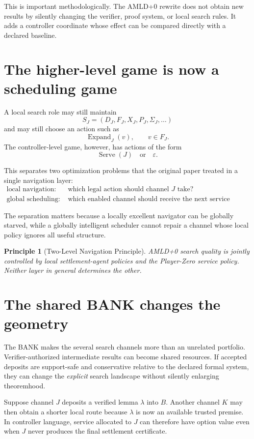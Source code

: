 \documentclass[11pt]{article}
\newtheorem{principle}[definition]{Principle}
\begin{document}
This is important methodologically.  The AMLD+0 rewrite does not obtain new
results by silently changing the verifier, proof system, or local search
rules.  It adds a controller coordinate whose effect can be compared directly
with a declared baseline.

\section{The higher-level game is now a scheduling game}

A local search role may still maintain
\[
S_J=(D_J,F_J,X_J,P_J,\Sigma_J,\ldots)
\]
and may still choose an action such as
\[
\operatorname{Expand}_J(v),\qquad v\in F_J.
\]
The controller-level game, however, has actions of the form
\[
\operatorname{Serve}(J)
\quad\text{or}\quad
\varepsilon.
\]

This separates two optimization problems that the original paper treated in a
single navigation layer:
\begin{align*}
\text{local navigation: } &
\text{which legal action should channel }J\text{ take?}\\
\text{global scheduling: } &
\text{which enabled channel should receive the next service turn?}
\end{align*}

The separation matters because a locally excellent navigator can be globally
starved, while a globally intelligent scheduler cannot repair a channel whose
local policy ignores all useful structure.

\begin{principle}[Two-Level Navigation Principle]
AMLD+0 search quality is jointly controlled by local settlement-agent policies
and the Player-Zero service policy.  Neither layer in general determines the
other.
\end{principle}

\section{The shared BANK changes the geometry}

The BANK makes the several search channels more than an unrelated portfolio.
Verifier-authorized intermediate results can become shared resources.  If
accepted deposits are support-safe and conservative relative to the declared
formal system, they can change the \emph{explicit} search landscape without
silently enlarging theoremhood.

Suppose channel $J$ deposits a verified lemma $\lambda$ into $B$.  Another
channel $K$ may then obtain a shorter local route because $\lambda$ is now an
available trusted premise.  In controller language, service allocated to $J$
can therefore have option value even when $J$ never produces the final
settlement certificate.
\end{document}
